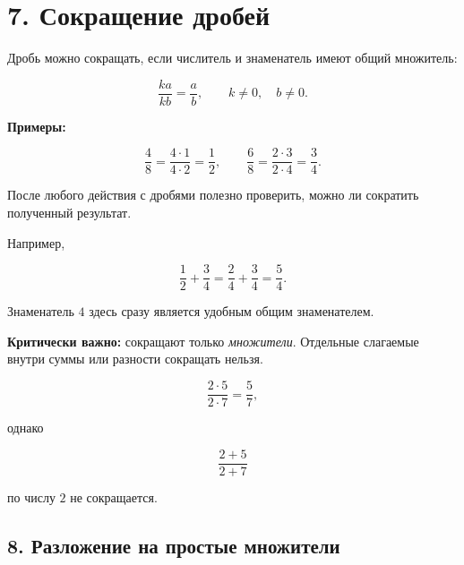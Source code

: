 \documentclass[a4paper,12pt]{article}
\begin{document}
\begin{center}
\end{center}

\clearpage

\section*{7. Сокращение дробей}

Дробь можно сокращать,
если числитель и знаменатель имеют общий множитель:

\[
\frac{ka}{kb}
=
\frac ab,
\qquad
k\ne0,
\quad
b\ne0.
\]

\textbf{Примеры:}

\[
\frac48
=
\frac{4\cdot1}{4\cdot2}
=
\frac12,
\qquad
\frac68
=
\frac{2\cdot3}{2\cdot4}
=
\frac34.
\]

После любого действия с дробями полезно проверить,
можно ли сократить полученный результат.

Например,

\[
\frac12+\frac34
=
\frac24+\frac34
=
\frac54.
\]

Знаменатель \(4\) здесь сразу является удобным
общим знаменателем.

\textbf{Критически важно:}
сокращают только \emph{множители}.
Отдельные слагаемые внутри суммы или разности
сокращать нельзя.

\[
\frac{2\cdot5}{2\cdot7}
=
\frac57,
\]

однако

\[
\frac{2+5}{2+7}
\]

по числу \(2\) не сокращается.

\subsection*{8. Разложение на простые множители}
\end{document}
